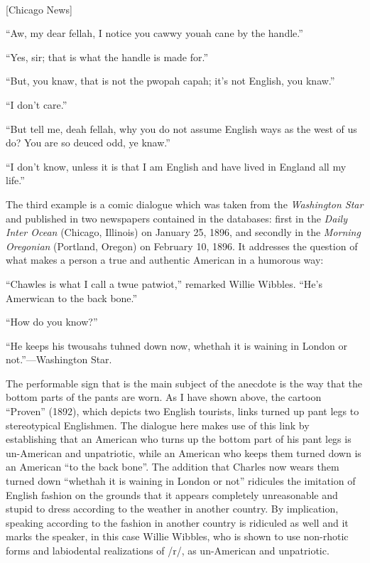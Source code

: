 \begin{ipquote}
\begin{center}
\\
{[Chicago News]}
\end{center}

“Aw, my dear fellah, I notice you cawwy youah cane by the handle.”

“Yes, sir; that is what the handle is made for.”

“But, you knaw, that is not the pwopah capah; it’s not English, you knaw.”

“I don’t care.”

“But tell me, deah fellah, why you do not assume English ways as the west of us do? You are so deuced odd, ye knaw.”

“I don’t know, unless it is that I am English and have lived in England all my life.”
\end{ipquote}

The third example is a comic dialogue which was taken from the \emph{Washington Star} and published in two newspapers contained in the databases: first in the \emph{Daily Inter Ocean} (Chicago, Illinois) on January 25, 1896, and secondly in the \emph{Morning Oregonian} (Portland, Oregon) on February 10, 1896. It addresses the question of what makes a person a true and authentic American in a humorous way:

\begin{ipquote}
“Chawles is what I call a twue patwiot,” remarked Willie Wibbles. “He’s Amerwican to the back bone.”

“How do you know?”

“He keeps his twousahs tuhned down now, whethah it is waining in London or not.”—Washington Star.
\end{ipquote}


The performable sign that is the main subject of the anecdote is the way that the bottom parts of the pants are worn. As I have shown above, the cartoon “Proven” (1892), which depicts two English tourists, links turned up pant legs to stereotypical Englishmen. The dialogue here makes use of this link by establishing that an American who turns up the bottom part of his pant legs is un-American and unpatriotic, while an American who keeps them turned down is an American “to the back bone”. The addition that Charles now wears them turned down “whethah it is waining in London or not” ridicules the imitation of English fashion on the grounds that it appears completely unreasonable and stupid to dress according to the weather in another country. By implication, speaking according to the fashion in another country is ridiculed as well and it marks the speaker, in this case Willie Wibbles, who is shown to use non-rhotic forms and labiodental realizations of /r/, as un-American and unpatriotic.


